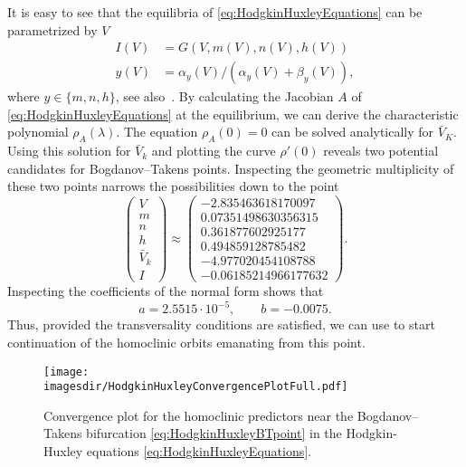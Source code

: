 It is easy to see that the equilibria of \cref{eq:HodgkinHuxleyEquations} can be
parametrized by $V$
\begin{equation*}
    \begin{aligned}
        I(V) &= G(V, m(V), n(V), h(V)) \\
        y(V) &= \alpha_y(V)/(\alpha_y(V)+\beta_y(V)),
    \end{aligned}
\end{equation*}
where $y\in\{m,n,h\}$, see also~\cite{Guckenheimer@1993}. By calculating the Jacobian $A$ of
\cref{eq:HodgkinHuxleyEquations} at the equilibrium, we can derive the
characteristic polynomial $\rho_A(\lambda)$. The equation $\rho_A(0)=0$ can be
solved analytically for $\bar V_K$. Using this solution for $\bar V_k$ and
plotting the curve $\rho'(0)$ reveals two potential candidates for Bogdanov--Takens
points. Inspecting the geometric multiplicity of these two points narrows the
possibilities down to the point
\begin{equation}
\label{eq:HodgkinHuxleyBTpoint}
\begin{pmatrix}
    V \\m \\n \\h \\ \bar V_k \\ I 
\end{pmatrix}
\approx
\begin{pmatrix}
-2.835463618170097 \\ 0.07351498630356315 \\ 0.361877602925177 \\ 0.494859128785482 \\
-4.977020454108788 \\ -0.06185214966177632
\end{pmatrix}.
\end{equation}  
Inspecting the coefficients of the normal form shows that
\[
a = 2.5515\cdot 10^{-5}, \qquad b =  -0.0075.
\] 
Thus, provided the transversality conditions are satisfied, we can use \MATCONT to
start continuation of the homoclinic orbits emanating from this point.

\begin{figure}
    \texttt{[image: \\imagesdir/HodgkinHuxleyConvergencePlotFull.pdf]}
    \caption{Convergence plot for the homoclinic predictors near the
    Bogdanov--Takens bifurcation \cref{eq:HodgkinHuxleyBTpoint} in the
    Hodgkin-Huxley equations \cref{eq:HodgkinHuxleyEquations}.}
    \label{fig:HodgkinHuxleyConvergencePlot}
\end{figure}

